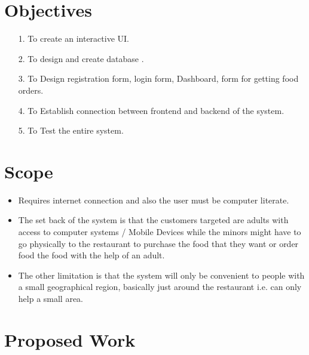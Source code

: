 \documentclass[english]{article}
\begin{document}
\section{Objectives} %
\begin{itemize}

\item[1.] To create an interactive UI. 

\item[2.] To design and create database .

\item[3.] To Design registration form, login form, Dashboard, form for getting food orders.

\item[4.] To Establish connection between frontend and backend of the system.

\item[5.] To Test the entire system.

\end{itemize}

\section{Scope} %

\begin{itemize}
\item Requires internet connection and also the user must be computer literate.
\item The set back of the system is that the customers targeted are adults with access to
computer systems / Mobile Devices while the minors might have to go physically to
the restaurant to purchase the food that they want or order food the food with the
help of an adult.
\item The other limitation is that the system will only be convenient to people with a small
geographical region, basically just around the restaurant i.e. can only help a small area.
\end{itemize}
\section{Proposed Work} %
\end{document}
